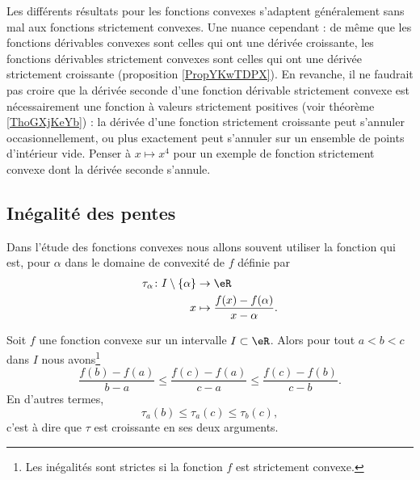 \begin{normaltext}
    Les différents résultats pour les fonctions convexes s'adaptent généralement sans mal aux fonctions strictement convexes. Une nuance cependant : de même que les fonctions dérivables convexes sont celles qui ont une dérivée croissante, les fonctions dérivables strictement convexes sont celles qui ont une dérivée strictement croissante (proposition \ref{PropYKwTDPX}). En revanche, il ne faudrait pas croire que la dérivée seconde d'une fonction dérivable strictement convexe est nécessairement une fonction à valeurs strictement positives (voir théorème \ref{ThoGXjKeYb}) : la dérivée d'une fonction strictement croissante peut s'annuler occasionnellement, ou plus exactement peut s'annuler sur un ensemble de points d'intérieur vide. Penser à \( x\mapsto x^4\) pour un exemple de fonction strictement convexe dont la dérivée seconde s'annule.
\end{normaltext}

\subsection{Inégalité des pentes}

Dans l'étude des fonctions convexes nous allons souvent utiliser la fonction  qui est, pour \( \alpha\) dans le domaine de convexité de \( f\) définie par
\begin{equation}    \label{EqRYBazWd}
    \begin{aligned}
        \tau_{\alpha}\colon I\setminus\{ \alpha \}&\to \eR \\
        x&\mapsto \frac{ f(x)-f(\alpha) }{ x-\alpha }. 
    \end{aligned}
\end{equation}

\begin{proposition} \label{PropMDMGjGO}
    Soit \( f\) une fonction convexe sur un intervalle \( I\subset \eR\). Alors pour tout \( a<b<c\) dans \( I\) nous avons\footnote{Les inégalités sont strictes si la fonction \( f\) est strictement convexe.}
    \begin{equation}
        \frac{ f(b)-f(a)  }{ b-a }\leq\frac{ f(c)-f(a) }{ c-a }\leq \frac{ f(c)-f(b) }{ c-b }.
    \end{equation}
    En d'autres termes,
    \begin{equation}
        \tau_a(b)\leq\tau_a(c)\leq \tau_b(c),
    \end{equation}
    c'est à dire que \( \tau\) est croissante en ses deux arguments.
\end{proposition}

